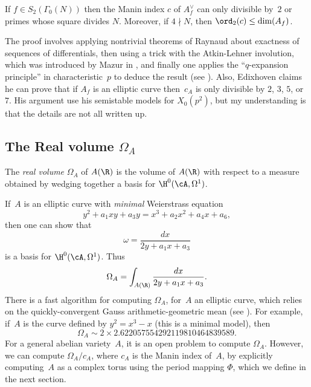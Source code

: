 \documentclass{report}
\begin{document}
\begin{theorem}
  If $f\in S_2(\Gamma_0(N))$ then the Manin index $c$ of
  $A_f^{\vee}$ can only divisible by~$2$ or primes
  whose square divides $N$.  Moreover, if $4\nmid N$, then
  $\ord_2(c)\leq \dim(A_f)$.
\end{theorem}
The proof involves applying nontrivial theorems of Raynaud about
exactness of sequences of differentials, then using a trick with the
Atkin-Lehner involution, which was introduced by Mazur in
\cite{mazur:rational}, and finally one applies the ``$q$-expansion
principle'' in characteristic~$p$ to deduce the result (see
\cite{agashe-stein:manin}).  Also, Edixhoven claims he can prove that
if $A_f$ is an elliptic curve then~$c_A$ is only divisible by $2$,
$3$, $5$, or $7$.  His argument use his semistable models for
$X_0(p^2)$, but my understanding is that the details are not all
written up.


\subsection{The Real volume $\Omega_A$}


\begin{definition}
  The {\em real volume} $\Omega_A$ of $A(\R)$ is the volume of $A(\R)$
  with respect to a measure obtained by wedging together a basis for
  $\H^0(\cA,\Omega^1)$.
\end{definition}

If~$A$ is an elliptic curve with {\em minimal} Weierstrass equation
$$y^2 + a_1 xy + a_3 y = x^3 + a_2 x^2 + a_4 x + a_6,$$
then one can show that
\begin{equation}\label{eqn:mindif}
\omega = \frac{dx}{2y+a_1x + a_3}
\end{equation}
is a basis for $\H^0(\cA,\Omega^1)$.  Thus
$$
\Omega_A = \int_{A(\R)} \frac{dx}{2y+a_1x + a_3}.
$$
There is a fast algorithm for computing $\Omega_A$, for~$A$ an
elliptic curve, which relies on the quickly-convergent Gauss
arithmetic-geometric mean (see \cite[\S3.7]{cremona:algs}).
For example, if~$A$ is the curve defined by $y^2=x^3-x$ (this
is a minimal model), then
$$
  \Omega_A \sim 2 \times 2.622057554292119810464839589.
  $$
  For a general abelian variety~$A$, it is an open problem to
  compute $\Omega_A$.  However, we can compute $\Omega_A/c_A$, where
  $c_A$ is the Manin index of~$A$, by explicitly computing~$A$ as a
  complex torus using the period mapping $\Phi$, which we
  define in the next section.
\end{document}
